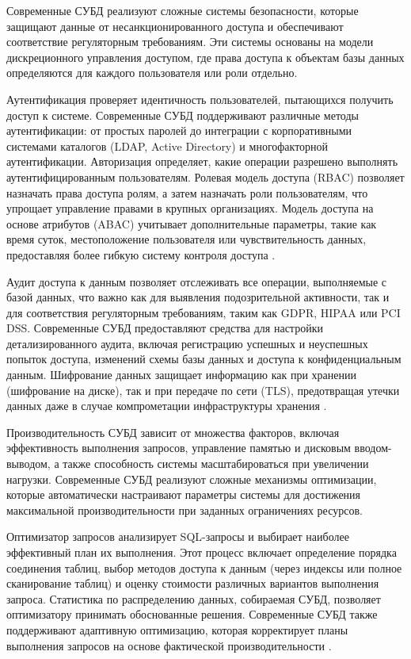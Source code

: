 \documentclass{SibFU-docs}
\begin{document}

Современные СУБД реализуют сложные системы безопасности, которые защищают данные от несанкционированного доступа и обеспечивают соответствие регуляторным требованиям. Эти системы основаны на модели дискреционного управления доступом, где права доступа к объектам базы данных определяются для каждого пользователя или роли отдельно.

Аутентификация проверяет идентичность пользователей, пытающихся получить доступ к системе. Современные СУБД поддерживают различные методы аутентификации: от простых паролей до интеграции с корпоративными системами каталогов (LDAP, Active Directory) и многофакторной аутентификации. Авторизация определяет, какие операции разрешено выполнять аутентифицированным пользователям. Ролевая модель доступа (RBAC) позволяет назначать права доступа ролям, а затем назначать роли пользователям, что упрощает управление правами в крупных организациях. Модель доступа на основе атрибутов (ABAC) учитывает дополнительные параметры, такие как время суток, местоположение пользователя или чувствительность данных, предоставляя более гибкую систему контроля доступа \cite{gdpr}.

Аудит доступа к данным позволяет отслеживать все операции, выполняемые с базой данных, что важно как для выявления подозрительной активности, так и для соответствия регуляторным требованиям, таким как GDPR, HIPAA или PCI DSS. Современные СУБД предоставляют средства для настройки детализированного аудита, включая регистрацию успешных и неуспешных попыток доступа, изменений схемы базы данных и доступа к конфиденциальным данным. Шифрование данных защищает информацию как при хранении (шифрование на диске), так и при передаче по сети (TLS), предотвращая утечки данных даже в случае компрометации инфраструктуры хранения \cite{gdpr}.


Производительность СУБД зависит от множества факторов, включая эффективность выполнения запросов, управление памятью и дисковым вводом-выводом, а также способность системы масштабироваться при увеличении нагрузки. Современные СУБД реализуют сложные механизмы оптимизации, которые автоматически настраивают параметры системы для достижения максимальной производительности при заданных ограничениях ресурсов.

Оптимизатор запросов анализирует SQL-запросы и выбирает наиболее эффективный план их выполнения. Этот процесс включает определение порядка соединения таблиц, выбор методов доступа к данным (через индексы или полное сканирование таблиц) и оценку стоимости различных вариантов выполнения запроса. Статистика по распределению данных, собираемая СУБД, позволяет оптимизатору принимать обоснованные решения. Современные СУБД также поддерживают адаптивную оптимизацию, которая корректирует планы выполнения запросов на основе фактической производительности \cite{elmasri2016}.
\end{document}

